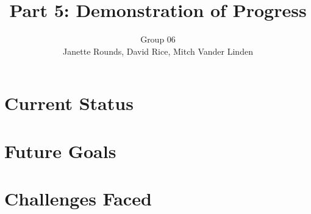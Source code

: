 \documentclass[11pt,twocolumn]{article}
\title{Part 5: Demonstration of Progress}
\author{Group 06 \\ 
\small Janette Rounds, \small David Rice, \small Mitch Vander Linden}
\begin{document}
\maketitle

\section{Current Status}


\section{Future Goals}

\section{Challenges Faced}
\end{document}
